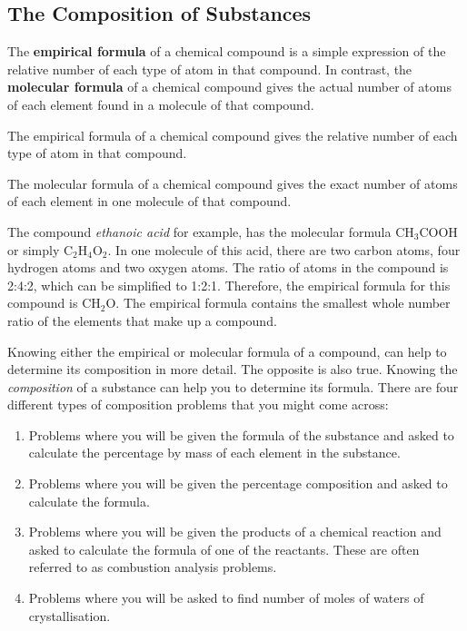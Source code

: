             \subsection{ The Composition of Substances}
            \nopagebreak
      \label{m38712*id280317}The \textbf{empirical formula} of a chemical compound is a simple expression of the relative number of each type of atom in that compound. In contrast, the \textbf{molecular formula} of a chemical compound gives the actual number of atoms of each element found in a molecule of that compound.\par 
\label{m38712*fhsst!!!underscore!!!id885}
 { \label{m38712*meaningfhsst!!!underscore!!!id885}
      \label{m38712*id280341}The empirical formula of a chemical compound gives the relative number of each type of atom in that compound. \par 
       } 
\label{m38712*fhsst!!!underscore!!!id888}
 { \label{m38712*meaningfhsst!!!underscore!!!id888}
      \label{m38712*id280360}The molecular formula of a chemical compound gives the exact number of atoms of each element in one molecule of that compound. \par 
       } 
      \label{m38712*id280372}The compound \textsl{ethanoic acid} for example, has the molecular formula $\mathrm{CH}{}_{3}\mathrm{COOH}$ or simply $\mathrm{C}{}_{2}\mathrm{H}{}_{4}\mathrm{O}{}_{2}$. In one molecule of this acid, there are two carbon atoms, four hydrogen atoms and two oxygen atoms. The ratio of atoms in the compound is 2:4:2, which can be simplified to 1:2:1. Therefore, the empirical formula for this compound is $\mathrm{CH}{}_{2}\mathrm{O}$. The empirical formula contains the smallest whole number ratio of the elements that make up a compound.\par 
      \label{m38712*id280450}Knowing either the empirical or molecular formula of a compound, can help to determine its composition in more detail. The opposite is also true. Knowing the \textsl{composition} of a substance can help you to determine its formula. There are four different types of composition problems that you might come across:\par 
      \label{m38712*id280463}\begin{enumerate}[noitemsep, label=\textbf{\arabic*}. ] 
            \label{m38712*uid68}\item Problems where you will be given the formula of the substance and asked to calculate the percentage by mass of each element in the substance.
\label{m38712*uid69}\item Problems where you will be given the percentage composition and asked to calculate the formula.
\label{m38712*uid70}\item Problems where you will be given the products of a chemical reaction and asked to calculate the formula of one of the reactants. These are often referred to as combustion analysis problems.
\label{m38712*uid7021}\item Problems where you will be asked to find number of moles of waters of crystallisation.
\end{enumerate}
